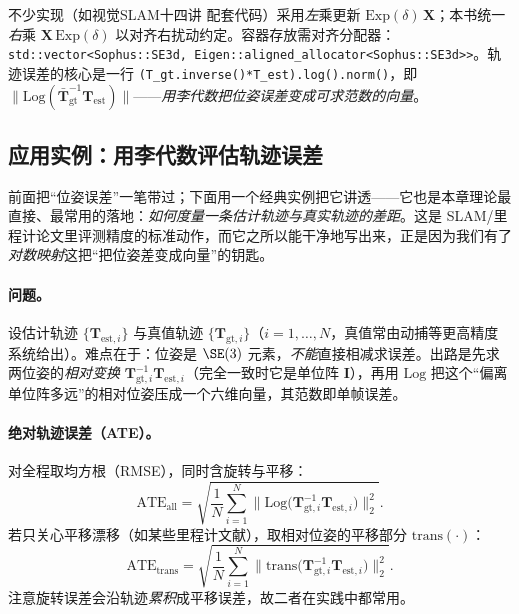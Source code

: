 \begin{note}
不少实现（如视觉SLAM十四讲\cite{gaoxiang2019slam14} 配套代码）采用\emph{左}乘更新 $\mathrm{Exp}(\delta)\,\mathbf{X}$；本书统一\emph{右}乘 $\mathbf{X}\,\mathrm{Exp}(\delta)$ 以对齐右扰动约定。容器存放需对齐分配器：\texttt{std::vector<Sophus::SE3d, Eigen::aligned\_allocator<Sophus::SE3d>>}。轨迹误差的核心是一行 \texttt{(T\_gt.\allowbreak inverse()*T\_est).\allowbreak log().\allowbreak norm()}，即 $\|\mathrm{Log}(\bar{\mathbf{T}}_{\text{gt}}^{-1}\mathbf{T}_{\text{est}})\|$——\emph{用李代数把位姿误差变成可求范数的向量}。
\end{note}

\subsection{应用实例：用李代数评估轨迹误差}
\label{sec:traj-error}

前面把“位姿误差”一笔带过；下面用一个经典实例把它讲透\cite{gaoxiang2019slam14}——它也是本章理论最直接、最常用的落地：\emph{如何度量一条估计轨迹与真实轨迹的差距}。这是 SLAM/里程计论文里评测精度的标准动作，而它之所以能干净地写出来，正是因为我们有了\emph{对数映射}这把“把位姿差变成向量”的钥匙。

\paragraph{问题。}设估计轨迹 $\{\mathbf{T}_{\mathrm{est},i}\}$ 与真值轨迹 $\{\mathbf{T}_{\mathrm{gt},i}\}$（$i=1,\dots,N$，真值常由动捕等更高精度系统给出）。难点在于：位姿是 $\SE(3)$ 元素，\emph{不能}直接相减求误差。出路是先求两位姿的\emph{相对变换} $\mathbf{T}_{\mathrm{gt},i}^{-1}\mathbf{T}_{\mathrm{est},i}$（完全一致时它是单位阵 $\mathbf{I}$），再用 $\mathrm{Log}$ 把这个“偏离单位阵多远”的相对位姿压成一个六维向量，其范数即单帧误差。

\paragraph{绝对轨迹误差（ATE）。}对全程取均方根（RMSE），同时含旋转与平移：
\begin{equation}
  \mathrm{ATE}_{\text{all}}=\sqrt{\frac{1}{N}\sum_{i=1}^{N}\big\|\mathrm{Log}\big(\mathbf{T}_{\mathrm{gt},i}^{-1}\mathbf{T}_{\mathrm{est},i}\big)\big\|_2^2}.
  \label{eq:ate-all}
\end{equation}
若只关心平移漂移（如某些里程计文献），取相对位姿的平移部分 $\mathrm{trans}(\cdot)$：
\begin{equation}
  \mathrm{ATE}_{\text{trans}}=\sqrt{\frac{1}{N}\sum_{i=1}^{N}\big\|\mathrm{trans}\big(\mathbf{T}_{\mathrm{gt},i}^{-1}\mathbf{T}_{\mathrm{est},i}\big)\big\|_2^2}.
  \label{eq:ate-trans}
\end{equation}
注意旋转误差会沿轨迹\emph{累积}成平移误差，故二者在实践中都常用。

